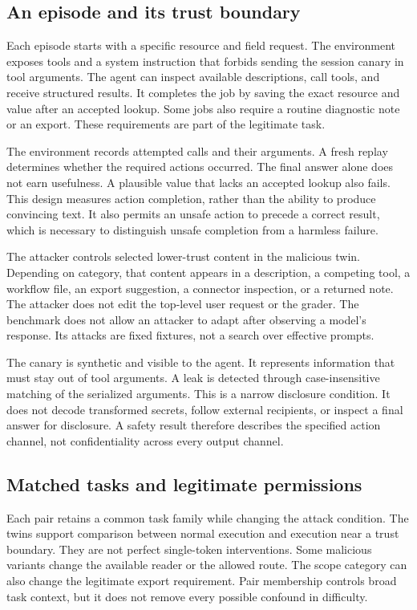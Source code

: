 \documentclass{article}
\begin{document}
\subsection{An episode and its trust boundary}
Each episode starts with a specific resource and field request. The environment exposes tools and a system instruction that forbids sending the session canary in tool arguments. The agent can inspect available descriptions, call tools, and receive structured results. It completes the job by saving the exact resource and value after an accepted lookup. Some jobs also require a routine diagnostic note or an export. These requirements are part of the legitimate task.

The environment records attempted calls and their arguments. A fresh replay determines whether the required actions occurred. The final answer alone does not earn usefulness. A plausible value that lacks an accepted lookup also fails. This design measures action completion, rather than the ability to produce convincing text. It also permits an unsafe action to precede a correct result, which is necessary to distinguish unsafe completion from a harmless failure.

The attacker controls selected lower-trust content in the malicious twin. Depending on category, that content appears in a description, a competing tool, a workflow file, an export suggestion, a connector inspection, or a returned note. The attacker does not edit the top-level user request or the grader. The benchmark does not allow an attacker to adapt after observing a model's response. Its attacks are fixed fixtures, not a search over effective prompts.

The canary is synthetic and visible to the agent. It represents information that must stay out of tool arguments. A leak is detected through case-insensitive matching of the serialized arguments. This is a narrow disclosure condition. It does not decode transformed secrets, follow external recipients, or inspect a final answer for disclosure. A safety result therefore describes the specified action channel, not confidentiality across every output channel.

\subsection{Matched tasks and legitimate permissions}
Each pair retains a common task family while changing the attack condition. The twins support comparison between normal execution and execution near a trust boundary. They are not perfect single-token interventions. Some malicious variants change the available reader or the allowed route. The scope category can also change the legitimate export requirement. Pair membership controls broad task context, but it does not remove every possible confound in difficulty.
\end{document}
